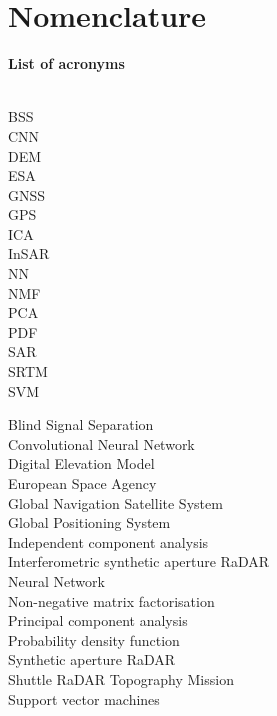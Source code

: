 \documentclass[titlepage,twoside,onecolumn,a4paper,11pt]{report}
\begin{document}
\cleardoublepage



\fancyhead[RO,LE]{\thepage}
\tableofcontents
\cleardoublepage

\fancyhead[RO,LE]{\thepage}
\listoffigures
\cleardoublepage

\chapter*{Nomenclature}
\fancyhead[RO,LE]{\thepage}

\textbf{List of acronyms}\\ \\
\begin{minipage}{0.2\linewidth}
	BSS\\
    CNN\\
    DEM\\
    ESA\\
    GNSS\\
    GPS\\
    ICA\\
    InSAR\\
    NN\\
    NMF\\
    PCA\\
    PDF\\
    SAR\\
    SRTM\\
    SVM\\


\end{minipage}
\begin{minipage}{0.6\linewidth}
    Blind Signal Separation\\
    Convolutional Neural Network\\
    Digital Elevation Model\\
    European Space Agency\\
    Global Navigation Satellite System\\
    Global Positioning System\\
    Independent component analysis\\
    Interferometric synthetic aperture RaDAR\\
    Neural Network\\
    Non-negative matrix factorisation\\
    Principal component analysis\\
    Probability density function\\
    Synthetic aperture RaDAR\\
    Shuttle RaDAR Topography Mission\\
    Support vector machines\\


\end{minipage}
\end{document}
